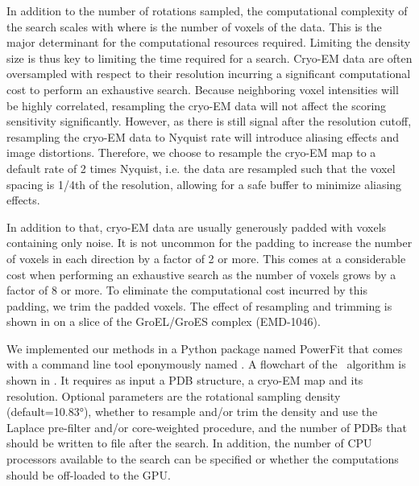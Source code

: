 In addition to the number of rotations sampled, the computational complexity of
the search scales with  where  is the number of
voxels of the data. This is the major determinant for the computational
resources required. Limiting the density size is thus key to limiting the time
required for a search. Cryo-EM data are often oversampled with respect to their
resolution incurring a significant computational cost to perform an exhaustive
search.  Because neighboring voxel intensities will be highly correlated,
resampling the cryo-EM data will not affect the scoring sensitivity
significantly. However, as there is still signal after the resolution cutoff,
resampling the cryo-EM data to Nyquist rate will introduce aliasing effects and
image distortions.  Therefore, we choose to resample the cryo-EM map to a
default rate of 2 times Nyquist, i.e. the data are resampled such that the
voxel spacing is 1/4th of the resolution, allowing for a safe buffer to
minimize aliasing effects. 

In addition to that, cryo-EM data are usually generously padded with voxels
containing only noise. It is not uncommon for the padding to increase the
number of voxels in each direction by a factor of 2 or more. This comes at a
considerable cost when performing an exhaustive search as the number of voxels
grows by a factor of 8 or more. To eliminate the computational cost incurred by
this padding, we trim the padded voxels. The effect of resampling and trimming
is shown in  on a slice of
the GroEL/GroES complex (EMD-1046). 


We implemented our methods in a Python package named PowerFit that comes with a
command line tool eponymously named \powerfit. A flowchart of the \powerfit\
algorithm is shown in . It requires as input
a PDB structure, a cryo-EM map and its resolution. Optional parameters are the
rotational sampling density (default=10.83°), whether to resample and/or trim
the density and use the Laplace pre-filter and/or core-weighted procedure, and
the number of PDBs that should be written to file after the search. In
addition, the number of CPU processors available to the search can be specified
or whether the computations should be off-loaded to the GPU. 

{}

